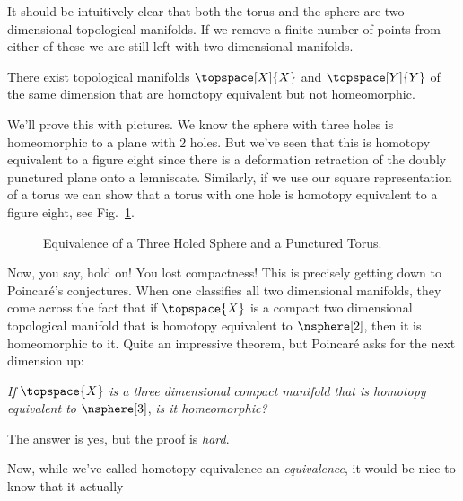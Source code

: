         It should be intuitively clear that both the torus and the
        sphere are two dimensional topological manifolds. If we remove a
        finite number of points from either of these we are still left
        with two dimensional manifolds.
        \begin{theorem}
            There exist topological manifolds $\topspace[X]{X}$ and
            $\topspace[Y]{Y}$ of the same dimension that are homotopy
            equivalent but not homeomorphic.
        \end{theorem}
        We'll prove this with pictures. We know the sphere with three
        holes is homeomorphic to a plane with 2 holes. But we've seen
        that this is homotopy equivalent to a figure eight since there
        is a deformation retraction of the doubly punctured plane onto
        a lemniscate. Similarly, if we use our square representation of
        a torus we can show that a torus with one hole is homotopy
        equivalent to a figure eight, see
        Fig.~\ref{fig:HE_Torus_Sphere_Fig_8}.
        \begin{figure}
                \centering
                \captionsetup{type=figure}
                \resizebox{\textwidth}{!}{%
                }
                \caption{Equivalence of a Three Holed Sphere
                         and a Punctured Torus.}
                \label{fig:HE_Torus_Sphere_Fig_8}
        \end{figure}
        Now, you say, hold on! You lost compactness! This is precisely
        getting down to Poincar\'{e}'s conjectures. When one classifies
        all two dimensional manifolds, they come across the fact that
        if $\topspace{X}$ is a compact two dimensional topological
        manifold that is homotopy equivalent to $\nsphere[2]$, then it
        is homeomorphic to it. Quite an impressive theorem, but
        Poincar\'{e} asks for the next dimension up:
        \begin{center}
            \textit{If} $\topspace{X}$ \textit{is a three dimensional}
            \textit{compact manifold that is homotopy equivalent to}
            $\nsphere[3]$, \textit{is it homeomorphic?}
        \end{center}
        The answer is yes, but the proof is \textit{hard}.
        \par\hfill\par
        Now, while we've called homotopy equivalence an
        \textit{equivalence}, it would be nice to know that it actually
